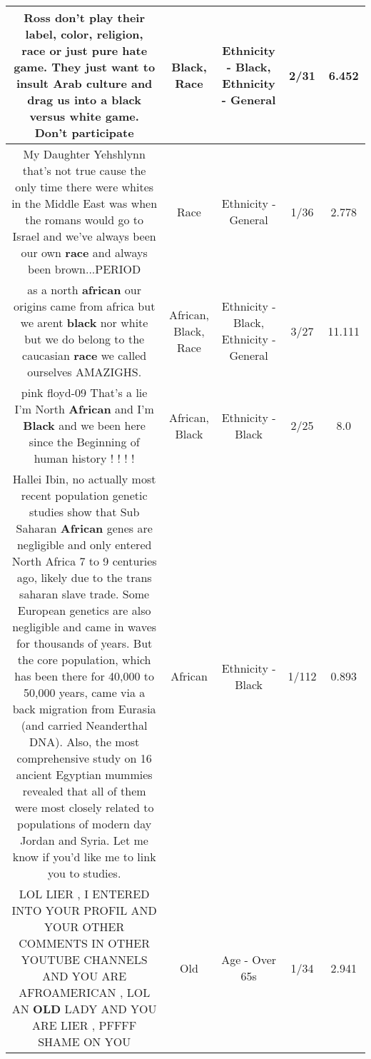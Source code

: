 \documentclass[11pt]{article}
\newlength\mylength
\begin{document}
\begin{center}
\begin{longtable}{|C{.65\mylength}|C{.30\mylength}|C{.12\mylength}|C{.12\mylength}|C{.12\mylength}|}
  \small Ross don't play their label, color, religion, \textbf{race} or just pure hate game. They just want to insult Arab culture and drag us into a \textbf{black} versus white game. Don't participate\normalsize   & Black, Race & Ethnicity - Black, Ethnicity - General & 2/31 & 6.452 \\  \hline
  \small My Daughter Yehshlynn that's not true cause the only time there were whites in the Middle East was when the romans would go to Israel and we've always been our own \textbf{race} and always been brown...PERIOD\normalsize   & Race & Ethnicity - General & 1/36 & 2.778 \\  \hline
  \small as a north \textbf{african} our origins came from africa but we arent \textbf{black} nor white but we do belong to the caucasian \textbf{race} we called ourselves AMAZIGHS.\normalsize   & African, Black, Race & Ethnicity - Black, Ethnicity - General & 3/27 & 11.111 \\  \hline
  \small pink floyd-09 That's a lie I'm North \textbf{African} and I'm \textbf{Black} and we been here since the Beginning of human history ! ! ! !\normalsize   & African, Black & Ethnicity - Black & 2/25 & 8.0 \\  \hline
  \small Hallei Ibin, no actually most recent population genetic studies show that Sub Saharan \textbf{African} genes are negligible and only entered North Africa 7 to 9 centuries ago, likely due to the trans saharan slave trade. Some European genetics are also negligible and came in waves for thousands of years. But the core population, which has been there for 40,000 to 50,000 years, came via a back migration from Eurasia (and carried Neanderthal DNA). Also, the most comprehensive study on 16 ancient Egyptian mummies revealed that all of them were most closely related to populations of modern day Jordan and Syria. Let me know if you'd like me to link you to studies.\normalsize   & African & Ethnicity - Black & 1/112 & 0.893 \\  \hline
  \small LOL LIER , I  ENTERED  INTO YOUR  PROFIL AND YOUR  OTHER  COMMENTS  IN OTHER YOUTUBE  CHANNELS AND YOU ARE AFROAMERICAN , LOL AN \textbf{OLD}  LADY AND YOU ARE  LIER  , PFFFF SHAME ON YOU\normalsize   & Old & Age - Over 65s & 1/34 & 2.941 \\  \hline

\end{longtable}
\end{center}
\end{document}
